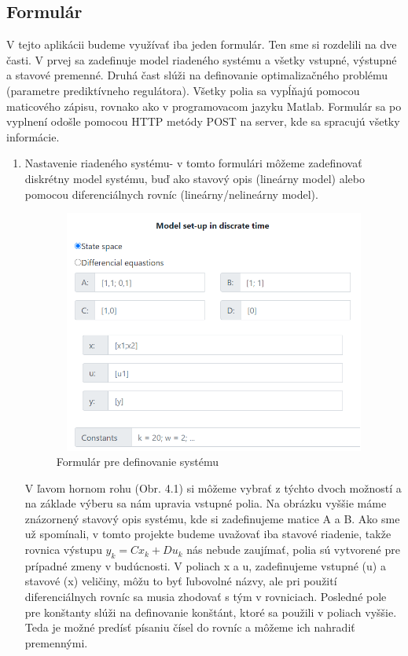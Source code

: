 \subsection{Formulár}
\label{subse:Formular}
V tejto aplikácii budeme využívať iba jeden formulár. Ten sme si rozdelili na dve časti. V prvej sa zadefinuje model riadeného systému a všetky vstupné, výstupné a stavové premenné. Druhá čast slúži na definovanie optimalizačného problému (parametre prediktívneho regulátora). Všetky polia sa vypĺňajú pomocou maticového zápisu, rovnako ako v programovacom jazyku Matlab. Formulár sa po vyplnení odošle pomocou HTTP metódy POST na server, kde sa spracujú všetky informácie. 
\begin{enumerate}
\item {Nastavenie riadeného systému- v tomto formulári môžeme zadefinovať diskrétny model systému, buď ako stavový opis (lineárny model) alebo pomocou diferenciálnych rovníc (lineárny/nelineárny model).
\begin{figure}[H]	
	\centering
	\includegraphics[width=11cm,height=8cm]{images/Model_setup}
	\caption{Formulár pre definovanie systému}
\end{figure}
V ľavom hornom rohu (Obr. 4.1) si môžeme vybrať z týchto dvoch možností a na základe výberu sa nám upravia vstupné polia. Na obrázku vyššie máme znázornený stavový opis systému, kde si zadefinujeme matice A a B. Ako sme už spomínali, v tomto projekte budeme uvažovať iba stavové riadenie, takže rovnica výstupu $y_{k} = Cx_{k} + Du_{k}$ nás nebude zaujímať, polia sú vytvorené pre prípadné zmeny v budúcnosti. V poliach x a u, zadefinujeme vstupné (u) a stavové (x) veličiny, môžu to byť ľubovolné názvy, ale pri použití diferenciálnych rovníc sa musia zhodovať s tým v rovniciach. Posledné pole pre konštanty slúži na definovanie konštánt, ktoré sa použili v poliach vyššie. Teda je možné predísť písaniu čísel do rovníc a môžeme ich nahradiť premennými. 
}
\end{enumerate}
